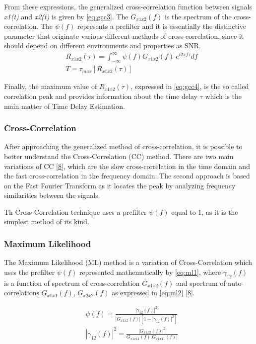 From these expressions, the generalized cross-correlation function between signals \textit{x1(t)} and \textit{x2(t)} is given by \ref{eq:gcc3}. The $G_{x1x2}(f)$ is the spectrum of the cross-correlation. The $\psi(f)$ represents a prefilter and it is essentially the distinctive parameter that originate various different methods of cross-correlation, since it should depend on different environments and properties as SNR. 
\begin{eqnarray}
& R_{x1x2}(\tau) = \int_{-\infty}^{\infty} \psi(f) G_{x1x2}(f)\ e^{i2\pi f\tau} df
\label{eq:gcc3}\\
& T = \tau_{max} [ R_{x1x2}(\tau) ]
\label{eq:gcc4}
\end{eqnarray}

Finally, the maximum value of $R_{x1x2}(\tau)$, expressed in \ref{eq:gcc4}, is the so called correlation peak and provides information about the time delay $\tau$ which is the main matter of Time Delay Estimation. 


\subsubsection{Cross-Correlation}

After approaching the generalized method of cross-correlation, it is possible to better understand the Cross-Correlation (CC) method. There are two main variations of CC [\hyperref[r:crosscorr]{8}], which are the slow cross-correlation in the  time domain and the fast cross-correlation in the frequency domain. The second approach is based on the Fast Fourier Transform as it locates the peak by analyzing frequency similarities between the signals. 

Th Cross-Correlation technique uses a prefilter $\psi(f)$ equal to 1, as it is the simplest method of its kind.

\subsubsection{Maximum Likelihood}

The Maximum Likelihood (ML) method is a variation of Cross-Correlation which uses the prefilter $\psi(f)$ represented mathematically by \ref{eq:ml1}, where $\gamma_{12}(f)$ is a function of spectrum of cross-correlation $G_{x1x2}(f)$ and spectrum of auto-correlations $G_{x1x1}(f)$, $G_{x2x2}(f)$ as expressed in \ref{eq:ml2} [\hyperref[r:crosscorr]{8}].

\begin{eqnarray}
& \psi(f) = \frac{|\gamma_{12}(f)|^2}{|G_{x1x2}(f)|[1-|\gamma_{12}(f)|^2]}
\label{eq:ml1} \\
& |\gamma_{12}(f)|^2 = \frac{|G_{x1x2}(f)|^2}{G_{x1x11}(f) . G_{x1x11}(f)]}
\label{eq:ml2} 
\end{eqnarray}

